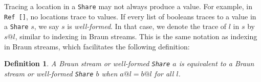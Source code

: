 \documentclass[envcountsect]{llncs}
\newcommand{\ord}[1]{\|#1\|}
\newcommand{\app}{+\!\!\!+\ }
\newcommand{\share}{{\tt Share} }
\newtheorem{definition}{Definition}
\begin{document}
Tracing a location in a \share may not always produce a value.
For example, in {\tt Ref []}, no locations trace to values.
If every list of booleans traces to a value in a \share $s$, we say $s$ is {\em well-formed}.
In that case, we denote the trace of $l$ in $s$ by $s@l$, similar to indexing in Braun streams.
This is the same notation as indexing in Braun streams, which facilitates the following definition:

\begin{definition}
A Braun stream or well-formed \share $a$ is {\em equivalent} to a Braun stream or well-formed \share $b$ when $a@l = b@l$ for all $l$.
\end{definition}

\begin{comment}
The type \share has a constructor {\tt Ref} that contains an list of booleans.
We call this list a {\em pointer}; a pointer represents a location.
a pointer $p$ at location $l$ indicates that the it points to a location in the stream that is bisimilar to the location in the stream that the stream at the {\tt Ref} shares with.
For instance, the stream {\tt smallEyes} in Fig.~\ref{braunShare} could be represented as a \share as {\tt Branch 'i' (Ref []) (Ref [])}.
References are context dependent, so the locations that are {\tt Ref []} in 
{\tt Branch 'j' (Ref []) (Branch 'i' (Ref []) (Ref []))}
refer back to the Braun stream with 'j' at the head.
If in a \share $s$ every list of booleans traces to a value, we say $s$ is {\em valid}.
A \share is called {\em well-formed} if, for every {\tt Ref b} at location $l$, $\ord{b} < \ord{l}$.
A valid \share can be transformed into a well-formed \share of equivalent size.
First, ensure every {\tt Ref} points to a {\tt Branch}.
This is possible since a {\tt Ref} at location $b$ traces (by the validity of $s$) to a {\tt Branch}.
This does not increase the size of the tree at all, as it simple replaces the pointers at certain {\tt Ref}s
Now if any {\tt Ref}s point to {\tt Branch}es with higher-numbered locations, 
Let $s$ be a valid {\tt Share}, and let $b$ point to a {\tt Ref} in $s$ that 
This ensures that finding the value at any location in a Braun stream represented by a well-formed \share terminates.
Attempting to find a value in a well-formed \share at location $b$ obviously succeeds if $b$ is a valid path in the tree.
If it is not, it must be interrupted by a leaf.
Assume the leaf is at location $l$ and refers to location $p$.
Then there is some finite list of booleans $r$ such that $l \app r = b$.
This is the remainder of $b$ that was not followed because the search was interrupted by the leaf at $l$.
Following the reference at $l$ would point us to the location $\ord{p \app r}$.
Since $\ord{p} < \ord{l}$, $\ord{p \app r} < \ord{l \app r} = \ord{b}$.
Thus, following a reference in a well-formed \share points to a smaller location, ensuring that following references terminates.
We will call the process of following a reference ``{\em resolving} a reference''.
In fact, any valid share is equivalent to a well-formed shares 
\end{comment}
\end{document}
